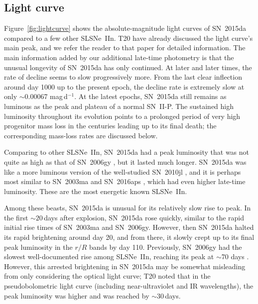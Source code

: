 \documentclass[fleqn,usenatbib,useAMS]{mnras}
\begin{document}
\subsection{Light curve}

Figure~\ref{fig:lightcurve} shows the absolute-magnitude light curves
of SN~2015da compared to a few other SLSNe~IIn.  T20 have already
discussed the light curve's main peak, and we refer the reader to that
paper for detailed information.  The main information added by our
additional late-time photometry is that the unusual longevity of
SN~2015da has only continued.  At later and later times, the rate of
decline seems to slow progressively more.  From the last clear inflection
around day 1000 up to the present epoch, the decline rate is extremely
slow at only $\sim$0.00067 mag\,d$^{-1}$.  At the latest epochs,
SN~2015da still remains as luminous as the peak and plateau of a
normal SN~II-P. The sustained high luminosity throughout its evolution
points to a prolonged period of very high progenitor mass loss in the
centuries leading up to its final death; the corresponding mass-loss
rates are discussed below.

Comparing to other SLSNe~IIn, SN~2015da had a peak luminosity that was
not quite as high as that of SN~2006gy \citep{smith07}, but it lasted
much longer.  SN~2015da was like a more luminous version of the
well-studied SN~2010jl \citep{smith11,fransson14,jencson16,tsvetkov16}, and
it is perhaps most similar to SN~2003ma \citep{rest11} and SN~2016aps \citep{nicholl20,suzuki21}, which had even higher late-time luminosity.  These are the most energetic known
SLSNe~IIn.

Among these beasts, SN~2015da is unusual for its relatively slow rise
to peak.  In the first $\sim 20$\,days after explosion, SN~2015da rose
quickly, similar to the rapid initial rise times of SN~2003ma and
SN~2006gy.  However, then SN~2015da halted its rapid brightening
around day 20, and from there, it slowly crept up to its final peak
luminosity in the $r/R$ bands by day 110.  Previously, SN~2006gy had
the slowest well-documented rise among SLSNe~IIn, reaching its peak at
$\sim$70 days \citep{smith07,smith10}.  However, this arrested
brightening in SN~2015da may be somewhat misleading from only considering the
optical light curve; T20 noted that in the pseudobolometric light
curve (including near-ultraviolet and IR wavelengths), the peak
luminosity was higher and was reached by $\sim$30\,days.
\end{document}
